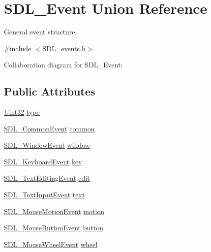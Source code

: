\hypertarget{union_s_d_l___event}{\section{S\-D\-L\-\_\-\-Event Union Reference}
\label{union_s_d_l___event}
}


General event structure.  




{\ttfamily \#include $<$S\-D\-L\-\_\-events.\-h$>$}



Collaboration diagram for S\-D\-L\-\_\-\-Event\-:
\subsection*{Public Attributes}
\begin{DoxyCompactItemize}
\item 
\hyperlink{_s_d_l__stdinc_8h_add440eff171ea5f55cb00c4a9ab8672d}{Uint32} \hyperlink{union_s_d_l___event_a237648bec242d2d5835f1a4250ddfa46}{type}
\item 
\hyperlink{struct_s_d_l___common_event}{S\-D\-L\-\_\-\-Common\-Event} \hyperlink{union_s_d_l___event_abe5cb8767f93de55163c8ddd4562a7f2}{common}
\item 
\hyperlink{struct_s_d_l___window_event}{S\-D\-L\-\_\-\-Window\-Event} \hyperlink{union_s_d_l___event_a826936b3275406d857bc6654669fae71}{window}
\item 
\hyperlink{struct_s_d_l___keyboard_event}{S\-D\-L\-\_\-\-Keyboard\-Event} \hyperlink{union_s_d_l___event_ab99927835cc77a9b6bb50b419b4a27df}{key}
\item 
\hyperlink{struct_s_d_l___text_editing_event}{S\-D\-L\-\_\-\-Text\-Editing\-Event} \hyperlink{union_s_d_l___event_a9a7e3b67b2654d4c5fc509676c6a7183}{edit}
\item 
\hyperlink{struct_s_d_l___text_input_event}{S\-D\-L\-\_\-\-Text\-Input\-Event} \hyperlink{union_s_d_l___event_aa4fc65c559d69f33c057c0c23d8414b8}{text}
\item 
\hyperlink{struct_s_d_l___mouse_motion_event}{S\-D\-L\-\_\-\-Mouse\-Motion\-Event} \hyperlink{union_s_d_l___event_ac3c89e190faacbe84280cd539453bab6}{motion}
\item 
\hyperlink{struct_s_d_l___mouse_button_event}{S\-D\-L\-\_\-\-Mouse\-Button\-Event} \hyperlink{union_s_d_l___event_ab6da2fa2687e5f849f270adecc64785f}{button}
\item 
\hyperlink{struct_s_d_l___mouse_wheel_event}{S\-D\-L\-\_\-\-Mouse\-Wheel\-Event} \hyperlink{union_s_d_l___event_a267d3f550715519ec90a81ccd0e6cbda}{wheel}

\end{DoxyCompactItemize}
